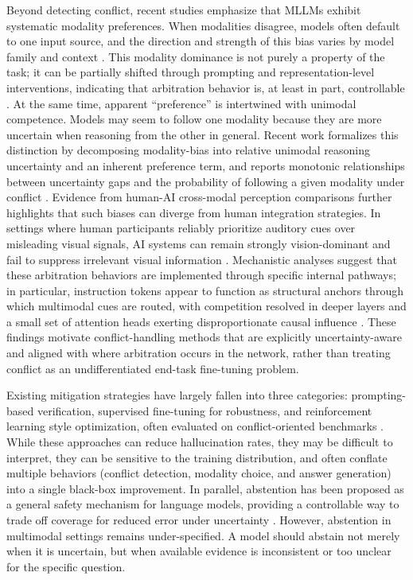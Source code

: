 \documentclass{article}
\begin{document}
Beyond detecting conflict, recent studies emphasize that MLLMs exhibit systematic modality preferences. When modalities disagree, models often default to one input source, and the direction and strength of this bias varies by model family and context \citep{zhang_evaluating_2025, hua_how_2025}. This modality dominance is not purely a property of the task; it can be partially shifted through prompting and representation-level interventions, indicating that arbitration behavior is, at least in part, controllable \citep{zhang_evaluating_2025}. At the same time, apparent “preference” is intertwined with unimodal competence. Models may seem to follow one modality because they are more uncertain when reasoning from the other in general. Recent work formalizes this distinction by decomposing modality-bias into relative unimodal reasoning uncertainty and an inherent preference term, and reports monotonic relationships between uncertainty gaps and the probability of following a given modality under conflict \citep{zhang_when_2025}. Evidence from human-AI cross-modal perception comparisons further highlights that such biases can diverge from human integration strategies. In settings where human participants reliably prioritize auditory cues over misleading visual signals, AI systems can remain strongly vision-dominant and fail to suppress irrelevant visual information \citep{jia_seeing_2025}. Mechanistic analyses suggest that these arbitration behaviors are implemented through specific internal pathways; in particular, instruction tokens appear to function as structural anchors through which multimodal cues are routed, with competition resolved in deeper layers and a small set of attention heads exerting disproportionate causal influence \citep{zhang_instruction_2026}. These findings motivate conflict-handling methods that are explicitly uncertainty-aware and aligned with where arbitration occurs in the network, rather than treating conflict as an undifferentiated end-task fine-tuning problem.

Existing mitigation strategies have largely fallen into three categories: prompting-based verification, supervised fine-tuning for robustness, and reinforcement learning style optimization, often evaluated on conflict-oriented benchmarks \citep{zhang_evaluating_2025}. While these approaches can reduce hallucination rates, they may be difficult to interpret, they can be sensitive to the training distribution, and often conflate multiple behaviors (conflict detection, modality choice, and answer generation) into a single black-box improvement. In parallel, abstention has been proposed as a general safety mechanism for language models, providing a controllable way to trade off coverage for reduced error under uncertainty \citep{wen_know_2025}. However, abstention in multimodal settings remains under-specified. A model should abstain not merely when it is uncertain, but when available evidence is inconsistent or too unclear for the specific question.
\end{document}
